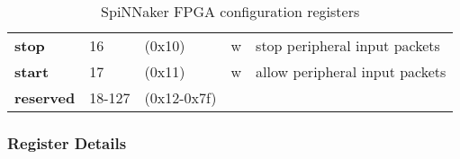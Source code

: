 \documentclass[11pt,a4paper,twoside]{article}
\begin{document}
\begin{center}
\begin{table}[!h]
\begin{tabularx}{\textwidth}{| p{34mm} p{13mm} p{21mm} p{7mm} X |}
		\textbf{stop}                        & 16                        & (0x10)                          & w                   & stop peripheral input packets         \\%
		\textbf{start}                       & 17                        & (0x11)                          & w                   & allow peripheral input packets         \\%
		\cellcolor{gray!25}\textbf{reserved} & \cellcolor{gray!25}18-127 & \cellcolor{gray!25} (0x12-0x7f) & \cellcolor{gray!25} & \cellcolor{gray!25}\\%
		\hline
	\end{tabularx}
	\caption{SpiNNaker FPGA configuration registers}
	\label{tab:spin_regs}
\end{table}
\end{center}


\subsubsection*{Register Details}
\end{document}
